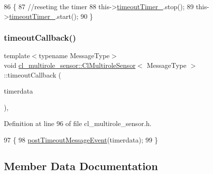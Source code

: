 \begin{DoxyCode}
86   \{
87     \textcolor{comment}{//reseting the timer}
88     this->\hyperlink{classcl__multirole__sensor_1_1ClMultiroleSensor_abd24848b13def072d7e89b830937439f}{timeoutTimer\_}.stop();
89     this->\hyperlink{classcl__multirole__sensor_1_1ClMultiroleSensor_abd24848b13def072d7e89b830937439f}{timeoutTimer\_}.start();
90   \}
\end{DoxyCode}
\mbox{\label{classcl__multirole__sensor_1_1ClMultiroleSensor_af09cd42f86b55e379a028cfd0387d76e}} 
\subsubsection{\texorpdfstring{timeout\+Callback()}{timeoutCallback()}}
{\footnotesize\ttfamily template$<$typename Message\+Type$>$ \\
void \hyperlink{classcl__multirole__sensor_1_1ClMultiroleSensor}{cl\+\_\+multirole\+\_\+sensor\+::\+Cl\+Multirole\+Sensor}$<$ Message\+Type $>$\+::timeout\+Callback (\begin{DoxyParamCaption}\item[{const ros\+::\+Timer\+Event \&}]{timerdata }\end{DoxyParamCaption})\hspace{0.3cm}{\ttfamily [inline]}, {\ttfamily [private]}}



Definition at line 96 of file cl\+\_\+multirole\+\_\+sensor.\+h.


\begin{DoxyCode}
97   \{
98     \hyperlink{classcl__multirole__sensor_1_1ClMultiroleSensor_a61a6e5dce7f1b34508701a8bc8f06ab9}{postTimeoutMessageEvent}(timerdata);
99   \}
\end{DoxyCode}


\subsection{Member Data Documentation}
\mbox{\label{classcl__multirole__sensor_1_1ClMultiroleSensor_a1f2bbfd7721308cb1eae4423d5fe999b}} 
